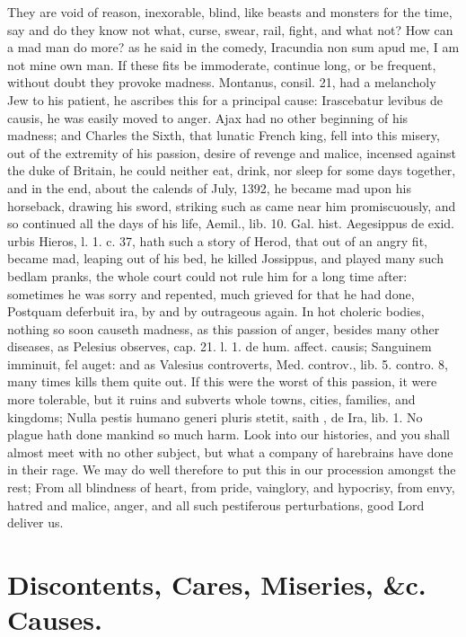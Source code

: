 {{They are void of reason, inexorable, blind, like beasts and monsters
for the time, say and do they know not what, curse, swear, rail, fight,
and what not? How can a mad man do more? as he said in the comedy,
 Iracundia non sum apud me, I am not mine own man. If these fits
be immoderate, continue long, or be frequent, without doubt they
provoke madness. Montanus, consil. 21, had a melancholy Jew to his
patient, he ascribes this for a principal cause: Irascebatur levibus de
causis, he was easily moved to anger. Ajax had no other beginning of
his madness; and Charles the Sixth, that lunatic French king, fell into
this misery, out of the extremity of his passion, desire of revenge and
malice, incensed against the duke of Britain, he could neither
eat, drink, nor sleep for some days together, and in the end, about the
calends of July, 1392, he became mad upon his horseback, drawing his
sword, striking such as came near him promiscuously, and so continued
all the days of his life, Aemil., lib. 10. Gal. hist. Aegesippus de
exid. urbis Hieros, l. 1. c. 37, hath such a story of Herod, that out
of an angry fit, became mad, leaping out of his bed, he killed
Jossippus, and played many such bedlam pranks, the whole court could
not rule him for a long time after: sometimes he was sorry and
repented, much grieved for that he had done, Postquam deferbuit ira, by
and by outrageous again. In hot choleric bodies, nothing so soon
causeth madness, as this passion of anger, besides many other diseases,
as Pelesius observes, cap. 21. l. 1. de hum. affect. causis; Sanguinem
imminuit, fel auget: and as Valesius controverts, Med. controv.,
lib. 5. contro. 8, many times kills them quite out. If this were the
worst of this passion, it were more tolerable, but it ruins and
subverts whole towns, cities, families, and kingdoms; Nulla
pestis humano generi pluris stetit, saith \Seneca, de Ira, lib. 1. No
plague hath done mankind so much harm. Look into our histories, and you
shall almost meet with no other subject, but what a company of
harebrains have done in their rage. We may do well therefore to put
this in our procession amongst the rest; From all blindness of heart,
from pride, vainglory, and hypocrisy, from envy, hatred and malice,
anger, and all such pestiferous perturbations, good Lord deliver us.

\section{Discontents, Cares, Miseries, \&c. Causes.}

}}
